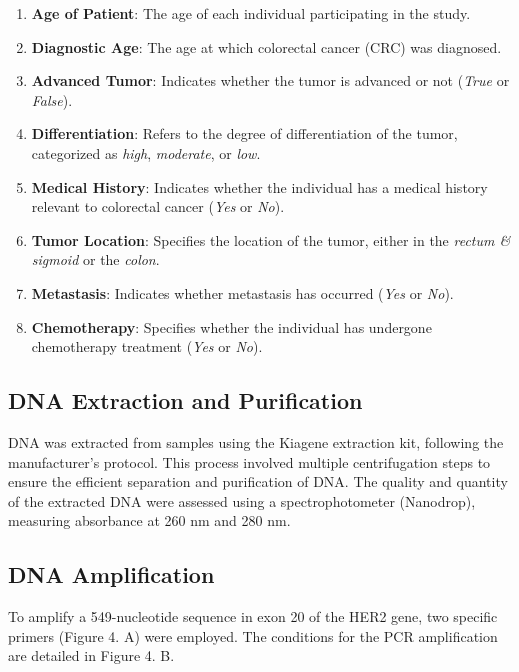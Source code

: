 \documentclass[12pt]{article}
\begin{document}
\begin{enumerate}
    \item \textbf{Age of Patient}: The age of each individual participating in the study.
    
    \item \textbf{Diagnostic Age}: The age at which colorectal cancer (CRC) was diagnosed.
    
    \item \textbf{Advanced Tumor}: Indicates whether the tumor is advanced or not (\textit{True} or \textit{False}).
    
    \item \textbf{Differentiation}: Refers to the degree of differentiation of the tumor, categorized as \textit{high}, \textit{moderate}, or \textit{low}.
    
    \item \textbf{Medical History}: Indicates whether the individual has a medical history relevant to colorectal cancer (\textit{Yes} or \textit{No}).
    
    \item \textbf{Tumor Location}: Specifies the location of the tumor, either in the \textit{rectum \& sigmoid} or the \textit{colon}.
    
    \item \textbf{Metastasis}: Indicates whether metastasis has occurred (\textit{Yes} or \textit{No}).
    
    \item \textbf{Chemotherapy}: Specifies whether the individual has undergone chemotherapy treatment (\textit{Yes} or \textit{No}).
\end{enumerate}



\subsection{DNA Extraction and Purification}
DNA was extracted from samples using the Kiagene extraction kit, following the manufacturer's protocol. This process involved multiple centrifugation steps to ensure the efficient separation and purification of DNA. The quality and quantity of the extracted DNA were assessed using a spectrophotometer (Nanodrop), measuring absorbance at 260 nm and 280 nm.

\subsection{DNA Amplification}
To amplify a 549-nucleotide sequence in exon 20 of the HER2 gene, two specific primers (Figure 4. A) were employed. The conditions for the PCR amplification are detailed in Figure 4. B.
\end{document}
